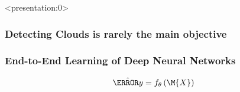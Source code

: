 \documentclass[%
  aspectratio=169,
  9pt,
ngerman,
  light,
  mathserif,
  professionalfont,
  affiliationintitlepagehead,
  titlegraphic,
   affiliation,
   navigationbar,
  progressbar,
]{beamer}
\begin{document}
{{\begin{frame}[plain]
	\vfill
	\vspace{6em}
\end{frame}
}

%

%		




\begin{frame}<presentation:0>

\frametitle{Detecting Clouds is rarely the main objective}
\LARGE
\centering\figcloudfilteringpipeline

\end{frame}

%


%
%

%
%
%
%
%

\begin{frame}

\frametitle{End-to-End Learning of Deep Neural Networks}
\centering

\Huge
\begin{equation*}
	\yhat = f_\theta \left(\M{X}\right)
\end{equation*}

\end{frame}

}
\end{document}
